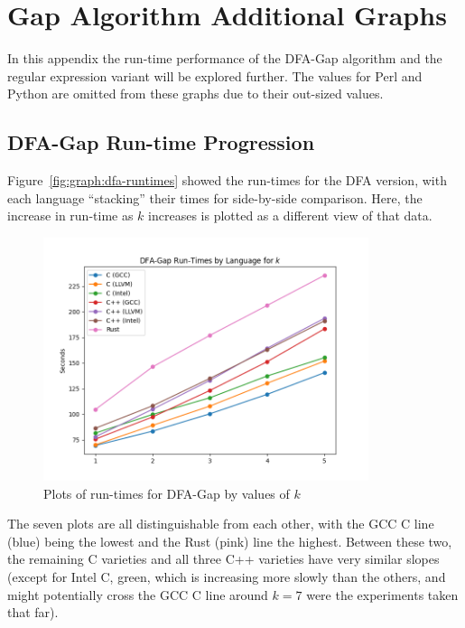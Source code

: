 \section{Gap Algorithm Additional Graphs}
\label{sec:extra_graphs}

In this appendix the run-time performance of the DFA-Gap algorithm and the regular expression variant will be explored further. The values for Perl and Python are omitted from these graphs due to their out-sized values.

\subsection{DFA-Gap Run-time Progression}
\label{subsec:dfa-gap-runtimes}

Figure~\ref{fig:graph:dfa-runtimes} showed the run-times for the DFA version, with each language ``stacking'' their times for side-by-side comparison. Here, the increase in run-time as $k$ increases is plotted as a different view of that data.

\begin{figure}[h]
	\centering
	\includegraphics[width=0.85\textwidth]{figures/k_runtimes-dfa_gap.png}
	\caption{Plots of run-times for DFA-Gap by values of $k$}
	\label{fig:graph:k_runtimes-dfa_gap}
\end{figure}

The seven plots are all distinguishable from each other, with the GCC C line (blue) being the lowest and the Rust (pink) line the highest. Between these two, the remaining C varieties and all three C++ varieties have very similar slopes (except for Intel C, green, which is increasing more slowly than the others, and might potentially cross the GCC C line around $k=7$ were the experiments taken that far).

